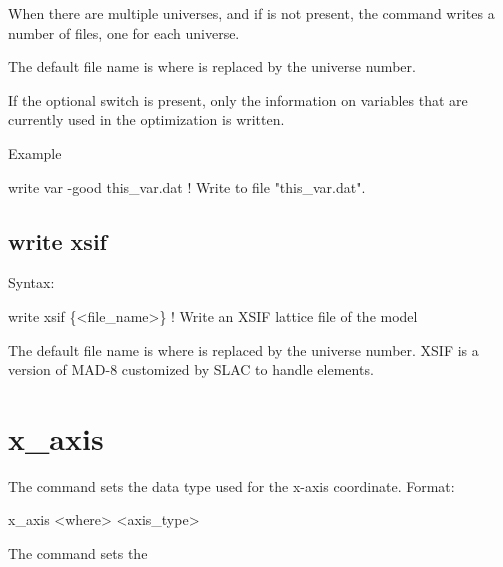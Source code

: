 {{{{{{{{{{{When there are multiple universes, and if  is not present, the 
command writes a number of files, one for each universe.

The default file name is  where \vn{\#} is replaced by the universe number. 

If the optional  switch is present, only the information on variables that are
currently used in the optimization is written.

Example
\begin{example}
  write var -good this_var.dat  ! Write to file "this_var.dat".
\end{example}


\subsection{write xsif}
\label{s:write.xsif}

Syntax:
\begin{example}
    write xsif \{<file_name>\}  ! Write an XSIF lattice file of the model
\end{example}

The default file name is  where \vn{\#} is replaced by the universe number. XSIF is
a version of MAD-8 customized by SLAC to handle  elements.


\section{x_axis}
\label{s:x.axis}

The  command sets the data type used for the x-axis coordinate. Format:
\begin{example}
  x_axis <where> <axis_type>
\end{example}

\vskip 7pt 

The  command sets the \vn{plot%
for the horizontal axis. Possibilities for \vn{<axis_type>} are:
\begin{example}
  index     -- Use data index
  ele_index -- Use data element index
  s         -- Use longitudinal position.
\end{example}
Note that \vn{index} only makes sense for data that has an index associated with it.

}}}}}}}}}}}}
